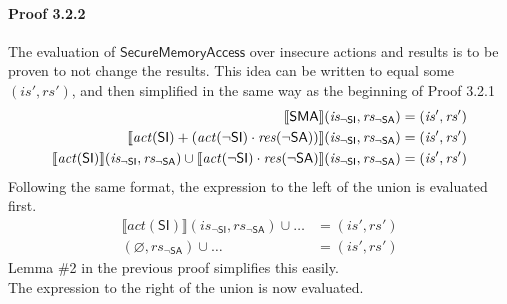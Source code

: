 \documentclass[12pt, letterpaper]{article}
\let\emptyset\varnothing
\begin{document}
 \paragraph{Proof 3.2.2}
     The evaluation of $\mathsf{SecureMemoryAccess}$ over insecure actions and results is to be proven to not change the results.  This idea can be written to equal some $(\mathit{is}', \mathit{rs}')$, and then simplified in the same way as the beginning of Proof 3.2.1
 \begin{align}
     \setcounter{equation}{0}
     \llbracket \mathsf{SMA} \rrbracket (\mathit{is_{\mathsf{\neg SI}}}, \mathit{rs_{\mathsf{\neg SA}}})
     &=
     (\mathit{is}', \mathit{rs}')
     \\
     \llbracket \mathit{act}(\mathsf{SI}) +
     (\mathit{act}(\neg\mathsf{SI}) \cdot
      \mathit{res}(\neg\mathsf{SA}))  \rrbracket (\mathit{is_{\mathsf{\neg SI}}}, \mathit{rs_{\mathsf{\neg SA}}})
     &=
     (\mathit{is}', \mathit{rs}')
     \\
     \llbracket \mathit{act}(\mathsf{SI}) \rrbracket (\mathit{is_{\mathsf{\neg SI}}}, \mathit{rs_{\mathsf{\neg SA}}}) \cup %
     \llbracket \mathit{act}(\neg\mathsf{SI}) \cdot
      \mathit{res}(\neg\mathsf{SA}) \rrbracket (\mathit{is_{\mathsf{\neg SI}}}, \mathit{rs_{\mathsf{\neg SA}}})
     &=
     (\mathit{is}', \mathit{rs}')
 \end{align}
     Following the same format, the expression to the left of the union is evaluated first.
 \begin{align}
     \llbracket \mathit{act}(\mathsf{SI}) \rrbracket (\mathit{is_{\mathsf{\neg SI}}}, \mathit{rs_{\mathsf{\neg SA}}}) \cup \ldots
     &=
     (\mathit{is}', \mathit{rs}')
     \\
     (\emptyset, \mathit{rs_{\mathsf{\neg SA}}}) \cup \ldots
     &=
     (\mathit{is}', \mathit{rs}')
 \end{align}
     Lemma \#2 in the previous proof simplifies this easily.\\
     The expression to the right of the union is now evaluated.
\end{document}
